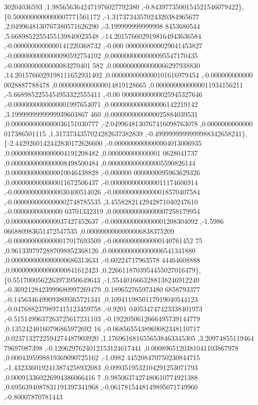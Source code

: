 \begin{DoxyCode}
      30204036593 ,1.9856563642471976027792380 ,-0.8439773500154521546079422\},
\{0.5000000000000007771561172 ,-1.3173734357024320384965677 ,2.0499648130767380571626290 ,-3.199999999999998
      8453680544 ,5.6689852255455139840023548 ,-14.2015766029198164943636584 ,-0.0000000000000141220368732 ,-0.000
      0000000000029041453827 ,-0.0000000000000090592754102 ,0.0000000000000095547170435 ,-0.0000000000000083270401
      582 ,0.0000000000000066297938830 ,14.2015766029198111652931402 ,0.0000000000000101616979454 ,-0.000000000000
      0028887788478 ,0.0000000000000014819128665 ,0.0000000000000011934156211 ,-5.6689852255454953322555411 ,-0.00
      00000000000025945327646 ,-0.0000000000000001997654071 ,0.0000000000000006142219142 ,3.1999999999999939603867
      460 ,0.0000000000000025884039531 ,0.0000000000000036151030777 ,-2.0499648130767416098763078 ,0.0000000000000
      017386501115 ,1.3173734357024282637382839 ,-0.4999999999999988342658241\},
\{-2.4429260142442830172626600 ,-0.0000000000000004013006935 ,0.0000000000000004191208482 ,0.000000000000001
      0628041737 ,0.0000000000000008498500484 ,0.0000000000000005590826144 ,0.0000000000000010046438828 ,-0.000000
      0000000095963629326 ,0.0000000000000011672506437 ,-0.0000000000000011174606914 ,-0.0000000000000030400514026
       ,-0.0000000000000018570407584 ,-0.0000000000000002748785535 ,3.4558282142942871040247610 ,-0.00000000000000
      03701332319 ,0.0000000000000007258179954 ,0.0000000000000037427452637 ,-0.0000000000000001208304092 ,-1.5986
      066880983651472547535 ,0.0000000000000006838375209 ,-0.0000000000000017017693509 ,-0.00000000000000140761452
      75 ,0.9613397972887098852368126 ,0.0000000000000006541341880 ,0.0000000000000000686313633 ,-0.60224717963578
      44464608888 ,0.0000000000000000841612423 ,0.2266118703954455027016479\},
\{0.5517000562263973950649643 ,-1.5544016663288138246912240 ,-0.3692128423999680997269479 ,0.189652765973480
      6858793377 ,-0.1456346499093809365721341 ,0.1094119850117919040544123 ,-0.0476882379897415123459758 ,-0.9201
      040534747423338401973 ,-0.5151499637263725617231103 ,-0.1922050612666495739144779 ,0.13524240160796865972692
      16 ,-0.0685655438969082348110717 ,0.0237132722594274487903920 ,1.1769616816556538463345305 ,3.20974855119464
      79697087398 ,-0.1206297624012153124617441 ,0.0008965120381041103867978 ,0.0004395998819369090725162 ,-1.0982
      445208470750230844715 ,-1.4323360192413874258932083 ,0.0993519532104291253071793 ,0.000913360226994386066416
      7 ,0.9850637427480610774921388 ,0.6956394087831191397341968 ,-0.0617815448149895071749960 ,-0.80007870781443

\end{DoxyCode}
